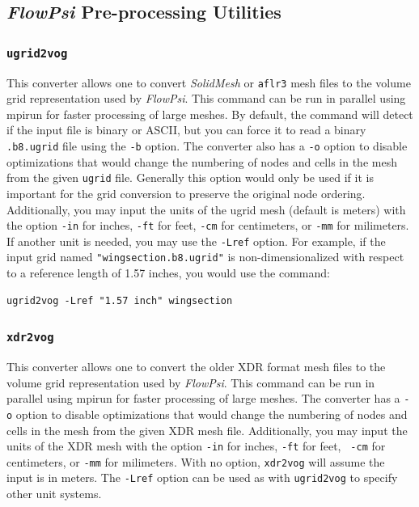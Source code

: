 \documentclass{article}
\begin{document}
\subsection{{\em FlowPsi} Pre-processing Utilities}

\subsubsection{\tt ugrid2vog}

This converter allows one to convert {\it SolidMesh} or {\tt aflr3}
mesh files to the volume grid representation used by {\em FlowPsi}.  This
command can be run in parallel using mpirun for faster processing of
large meshes.  By default, the command will detect if the input file is
binary or ASCII, but you can force it to read a binary {\tt .b8.ugrid}
file using the {\tt -b} option.  The converter also has a {\tt -o}
option to disable optimizations that would change the numbering of
nodes and cells in the mesh from the given {\tt ugrid} file.
Generally this option would only be used if it is important for the
grid conversion to preserve the original node ordering.  Additionally,
you may input the units of the ugrid mesh (default is meters) with the option {\tt -in}
for inches, {\tt -ft} for feet, {\tt -cm} for centimeters, or {\tt -mm} for milimeters.  If another
unit is needed, you may use the {\tt -Lref} option. For example, if the
input grid named {\tt "wingsection.b8.ugrid"} is
non-dimensionalized with respect to a reference length
of 1.57 inches, you would use the command:
\begin{verbatim}
ugrid2vog -Lref "1.57 inch" wingsection
\end{verbatim}

\subsubsection{\tt xdr2vog}

This converter allows one to convert the older XDR format mesh files
to the volume grid representation used by {\em FlowPsi}.  This command can be
run in parallel using mpirun for faster processing of large meshes.
The converter has a {\tt -o} option to disable optimizations that
would change the numbering of nodes and cells in the mesh from the
given XDR mesh file.  Additionally, you may input the units of the XDR
mesh with the option {\tt -in} for inches, {\tt -ft} for feet, {\tt
  -cm} for centimeters, or {\tt -mm} for milimeters.  With no option,
{\tt xdr2vog} will assume the input is in meters.  The {\tt -Lref}
option can be used as with {\tt ugrid2vog} to specify other unit
systems.  
\end{document}
